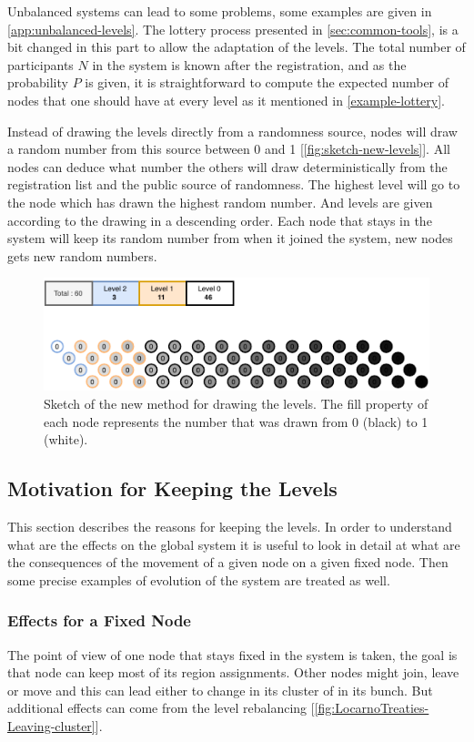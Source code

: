 \documentclass[a4paper,11pt,oneside]{report}
\begin{document}
Unbalanced systems can lead to some problems, some examples are given in \autoref{app:unbalanced-levels}. The lottery process presented in
\autoref{sec:common-tools}, is a bit changed in this part to allow the
adaptation of the levels. The total number of participants $N$ in the system is
known after the registration, and as the probability $P$ is given, it is
straightforward to compute the expected number of nodes that one should have at
every level as it mentioned in \autoref{example-lottery}. 

Instead of drawing the levels directly from a randomness source, nodes will
draw a random number from this source between 0 and 1
[\autoref{fig:sketch-new-levels}].  All nodes can deduce what number the others
will draw deterministically from the registration list and the public source of randomness.  The highest level will
go to the node which has drawn the highest random number.  And levels are given
according to the drawing in a descending order.  Each node that stays in the
system will keep its random number from when it joined the system, new nodes
gets new random numbers. 

\begin{figure}[!h] 
\centering
\includegraphics[width=400pt]{figures/Lottery-Locarno}
\caption{Sketch of the new method for drawing the levels. The fill property of each node represents
    the number that was drawn from 0 (black) to 1 (white).}
    \label{fig:sketch-new-levels}
\end{figure}


\subsection{Motivation for Keeping the Levels}
This section describes the reasons for keeping the levels. In order to
understand what are the effects on the global system it is useful to look in
detail at what are the consequences of the movement of a given node on a
given fixed node. Then some precise examples of evolution of the system are
treated as well. 

\subsubsection{Effects for a Fixed Node} 
The point of view of one node that stays fixed in the system is taken, the goal
is that node can keep most of its region assignments.  Other nodes might
join, leave or move and this can lead either to change in its cluster of in its
bunch. But additional effects can come from the level rebalancing [\autoref{fig:LocarnoTreaties-Leaving-cluster}]. 
\end{document}
